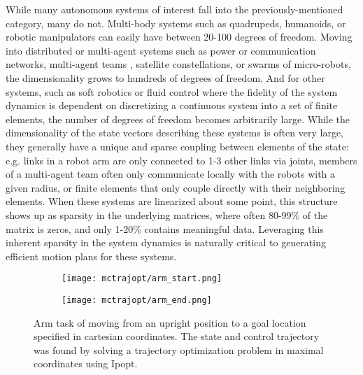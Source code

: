 \documentclass[../root.tex]{subfiles}
\begin{document}
While many autonomous systems of interest fall into the previously-mentioned category, many
do not. Multi-body systems such as quadrupeds, humanoids, or robotic manipulators can easily
have between 20-100 degrees of freedom. Moving into distributed or multi-agent systems such
as power or communication networks, multi-agent teams \cite{jackson_Scalable_2020}, 
satellite constellations, or swarms 
of micro-robots, the dimensionality grows to hundreds of degrees of freedom. And for other
systems, such as soft robotics or fluid control where the fidelity of the system dynamics is
dependent on discretizing a continuous system into a set of finite elements, the number of 
degrees of freedom becomes arbitrarily large. While the dimensionality of the state vectors
describing these systems is often very large, they generally have a unique and sparse coupling
between elements of the state: e.g. links in a robot arm are only connected to 1-3 other 
links via joints, members of a multi-agent team often only communicate locally with the 
robots with a given radius, or finite elements that only couple directly with their 
neighboring elements. When these systems are linearized about some point, this structure 
shows up as sparsity in the underlying matrices, where often 80-99\% of the matrix is zeros,
and only 1-20\% contains meaningful data. Leveraging this inherent sparsity in the system 
dynamics is naturally critical to generating efficient motion plans for these systems.

\begin{figure}[t]
    \centering
    \begin{subfigure}{0.48\columnwidth}
        \texttt{[image: mctrajopt/arm\_start.png]} 
    \end{subfigure}
    \begin{subfigure}{0.48\columnwidth}
        \texttt{[image: mctrajopt/arm\_end.png]} 
    \end{subfigure}
    \caption{Arm task of moving from an upright position to a goal location specified in 
        cartesian coordinates. The state and control trajectory was found by solving a 
        trajectory optimization problem in maximal coordinates using Ipopt.
    }
\end{figure}
\end{document}
